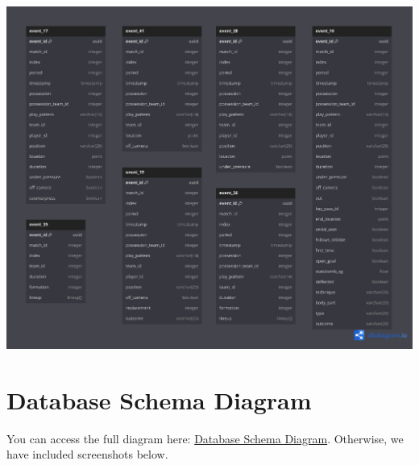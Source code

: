 \documentclass[12pt]{article}
\begin{document}
\includegraphics[width=\textwidth]{reduction/6.png}

\section*{Database Schema Diagram}

You can access the full diagram here: \href{https://dbdiagram.io/d/Database-schema-diagram-6619a29d03593b6b61e0aa1a}{Database Schema Diagram}. Otherwise, we have included screenshots below.
\smallskip
\end{document}
